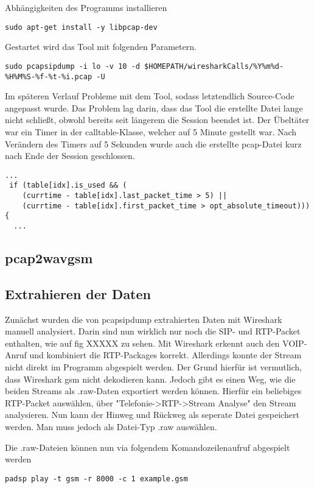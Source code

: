 Abhängigkeiten des Programms installieren
\begin{lstlisting}
sudo apt-get install -y libpcap-dev
\end{lstlisting}

Gestartet wird das Tool mit folgenden Parametern. 
\begin{lstlisting}
sudo pcapsipdump -i lo -v 10 -d $HOMEPATH/wiresharkCalls/%Y%m%d-%H%M%S-%f-%t-%i.pcap -U
\end{lstlisting}


Im späteren Verlauf Probleme mit dem Tool, sodass letztendlich Source-Code angepasst wurde. Das Problem lag darin, dass das Tool die erstellte Datei lange nicht schließt, obwohl bereits seit längerem die Session beendet ist. Der Übeltäter war ein Timer in der calltable-Klasse, welcher auf 5 Minute gestellt war. Nach Verändern des Timers auf 5 Sekunden wurde auch die erstellte pcap-Datei kurz nach Ende der Session geschlossen.

\begin{lstlisting}[xleftmargin=.04\textwidth, firstnumber=211]
  ...
 if (table[idx].is_used && (
 	(currtime - table[idx].last_packet_time > 5) ||
    (currtime - table[idx].first_packet_time > opt_absolute_timeout))){
  ...
\end{lstlisting}

\subsection{pcap2wavgsm}
\subsection{Extrahieren der Daten}
Zunächst wurden die von pcapsipdump extrahierten Daten mit Wireshark manuell analysiert. Darin sind nun wirklich nur noch die SIP- und RTP-Packet enthalten, wie auf fig XXXXX zu sehen. Mit Wireshark erkennt auch den VOIP-Anruf und kombiniert die RTP-Packages korrekt. Allerdings konnte der Stream nicht direkt im Programm abgespielt werden. Der Grund hierfür ist vermutlich, dass Wireshark gsm nicht dekodieren kann.
Jedoch gibt es einen Weg, wie die beiden Streams als .raw-Daten exportiert werden können. Hierfür ein beliebiges RTP-Packet auswählen, über "Telefonie->RTP->Stream Analyse" den Stream analysieren. Nun kann der Hinweg und Rückweg als seperate Datei gespeichert werden. Man muss jedoch als Datei-Typ .raw auswählen.

Die .raw-Dateien können nun via folgendem Komandozeilenaufruf abgespielt werden
\begin{lstlisting}
padsp play -t gsm -r 8000 -c 1 example.gsm
\end{lstlisting}

